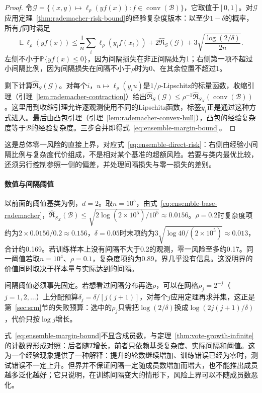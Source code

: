 \begin{proof}
令$\mathcal G=\{(x,y)\mapsto\ell_\rho(yf(x)):f\in\operatorname{conv}(\mathcal B)\}$，它取值于$[0,1]$。对$\mathcal G$应用定理~\ref{thm:rademacher-risk-bound}的经验复杂度版本：以至少$1-\delta$的概率，所有$f$同时满足
\[
 \mathbb E\,\ell_\rho(yf(x))
 \leq\frac1n\sum_i\ell_\rho(y_if(x_i))+2\widehat{\mathfrak R}_S(\mathcal G)
 +3\sqrt{\frac{\log(2/\delta)}{2n}}.
\]
左侧不小于$\mathbb P\{yf(x)\leq0\}$，因为间隔损失在非正间隔处为1；右侧第一项不超过小间隔比例，因为间隔损失在间隔不小于$\rho$时为0、在其余位置不超过1。

剩下计算$\widehat{\mathfrak R}_S(\mathcal G)$。对每个$i$，$u\mapsto\ell_\rho(y_iu)$是$1/\rho$-Lipschitz的标量函数，收缩引理（引理~\ref{lem:rademacher-contraction}）给出$\widehat{\mathfrak R}_S(\mathcal G)\leq\rho^{-1}\widehat{\mathfrak R}_{S_X}(\operatorname{conv}(\mathcal B))$。这里用到收缩引理允许逐观测使用不同的Lipschitz函数，标签$y_i$正是通过这种方式进入。最后由凸包引理（引理~\ref{lem:rademacher-convex-hull}），凸包的经验复杂度等于$\mathcal B$的经验复杂度。三步合并即得式~\eqref{eq:ensemble-margin-bound}。
\end{proof}

这是总体零一风险的直接上界，对应式~\eqref{eq:ensemble-direct-risk}：右侧由经验小间隔比例与复杂度代价组成，不是相对某个基准的超额风险。若要与类内最优比较，还须另行控制参照一侧的偏差，并处理间隔损失与零一损失的差别。

\paragraph{数值与间隔阈值}

以前面的阈值基类为例，$d=2$。取$n=10^5$，由式~\eqref{eq:ensemble-base-rademacher}，$\widehat{\mathfrak R}_{S_X}(\mathcal B)\leq\sqrt{2\log(2\times10^5)/10^5}\approx0.0156$。$\rho=0.2$时复杂度项约为$2\times0.0156/0.2\approx0.156$，$\delta=0.05$时末项约为$3\sqrt{\log40/(2\times10^5)}\approx0.013$，合计约0.169。若训练样本上没有间隔不大于0.2的观测，零一风险至多约0.17。同一阈值若取$n=10^4$、$\rho=0.1$，复杂度项约为0.89，界几乎没有信息。这说明界的价值同时取决于样本量与实际达到的间隔。

间隔阈值必须事先固定。若想看过间隔分布再选$\rho$，可以在网格$\rho_j=2^{-j}$（$j=1,2,\ldots$）上分配预算$\delta_j=\delta/[j(j+1)]$，对每个$j$应用定理再求并集，这正是第~\ref{sec:srm}节的失败预算：选中的$\rho_j$只需把$\log(2/\delta)$换成$\log(2j(j+1)/\delta)$，代价只按$\log j$增长。

式~\eqref{eq:ensemble-margin-bound}不显含成员数，与定理~\ref{thm:vote-growth-infinite}的计数界形成对照：后者随$T$增长，前者只依赖基类复杂度、实际间隔和阈值。这为一个经验现象提供了一种解释：提升的轮数继续增加、训练错误已经为零时，测试错误不一定上升。但界并不保证间隔一定随成员数增加而增大，也不能推出成员越多泛化越好；它只说明，在训练间隔变大的情形下，风险上界可以不随成员数恶化。

